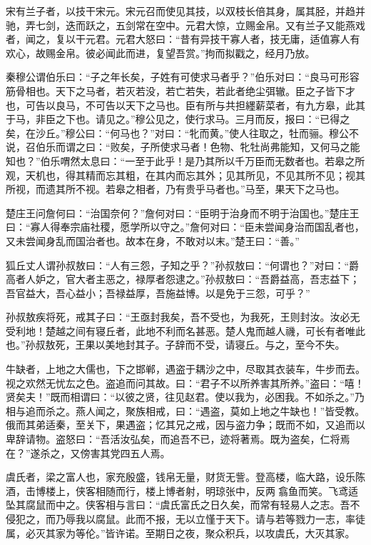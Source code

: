 \documentclass[]{article}
\begin{document}
宋有兰子者，以技干宋元。宋元召而使见其技，以双枝长倍其身，属其胫，并趋并驰，弄七剑，迭而跃之，五剑常在空中。元君大惊，立赐金帛。又有兰子又能燕戏者，闻之，复以干元君。元君大怒曰：``昔有异技干寡人者，技无庸，适值寡人有欢心，故赐金帛。彼必闻此而进，复望吾赏。''拘而拟戳之，经月乃放。

秦穆公谓伯乐曰：``子之年长矣，子姓有可使求马者乎？''伯乐对曰：``良马可形容筋骨相也。天下之马者，若灭若没，若亡若失，若此者绝尘弭辙。臣之子皆下才也，可告以良马，不可告以天下之马也。臣有所与共担纆薪菜者，有九方皋，此其于马，非臣之下也。请见之。''穆公见之，使行求马。三月而反，报曰：``已得之矣，在沙丘。''穆公曰：``何马也？''对曰：``牝而黄。''使人往取之，牡而骊。穆公不说，召伯乐而谓之曰：``败矣，子所使求马者！色物、牝牡尚弗能知，又何马之能知也？''伯乐喟然太息曰：``一至于此乎！是乃其所以千万臣而无数者也。若皋之所观，天机也，得其精而忘其粗，在其内而忘其外；见其所见，不见其所不见；视其所视，而遗其所不视。若皋之相者，乃有贵乎马者也。''马至，果天下之马也。

楚庄王问詹何曰：``治国奈何？''詹何对曰：``臣明于治身而不明于治国也。''楚庄王曰：``寡人得奉宗庙社稷，愿学所以守之。''詹何对曰：``臣未尝闻身治而国乱者也，又未尝闻身乱而国治者也。故本在身，不敢对以末。''楚王曰：``善。''

狐丘丈人谓孙叔敖曰：``人有三怨，子知之乎？''孙叔敖曰：``何谓也？''对曰：``爵高者人妒之，官大者主恶之，禄厚者怨逮之。''孙叔敖曰：``吾爵益高，吾志益下；吾官益大，吾心益小；吾禄益厚，吾施益博。以是免于三怨，可乎？''

孙叔敖疾将死，戒其子曰：``王亟封我矣，吾不受也，为我死，王则封汝。汝必无受利地！楚越之间有寝丘者，此地不利而名甚恶。楚人鬼而越人禨，可长有者唯此也。''孙叔敖死，王果以美地封其子。子辞而不受，请寝丘。与之，至今不失。

牛缺者，上地之大儒也，下之邯郸，遇盗于耦沙之中，尽取其衣装车，牛步而去。视之欢然无忧厷之色。盗追而问其故。曰：``君子不以所养害其所养。''盗曰：``嘻！贤矣夫！''既而相谓曰：``以彼之贤，往见赵君。使以我为，必困我。不如杀之。''乃相与追而杀之。燕人闻之，聚族相戒，曰：``遇盗，莫如上地之牛缺也！''皆受教。俄而其弟适秦，至关下，果遇盗；忆其兄之戒，因与盗力争；既而不如，又追而以卑辞请物。盗怒曰：``吾活汝弘矣，而追吾不已，迹将著焉。既为盗矣，仁将焉在？''遂杀之，又傍害其党四五人焉。

虞氏者，梁之富人也，家充殷盛，钱帛无量，财货无訾。登高楼，临大路，设乐陈酒，击博楼上，侠客相随而行，楼上博者射，明琼张中，反两翕鱼而笑。飞鸢适坠其腐鼠而中之。侠客相与言曰：``虞氏富氏之日久矣，而常有轻易人之志。吾不侵犯之，而乃辱我以腐鼠。此而不报，无以立慬于天下。请与若等戮力一志，率徒属，必灭其家为等伦。''皆许诺。至期日之夜，聚众积兵，以攻虞氏，大灭其家。
\end{document}
